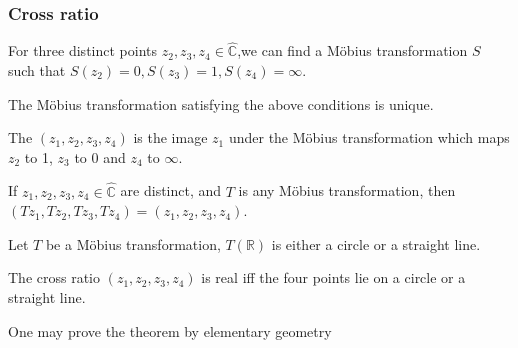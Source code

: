 \subsubsection{Cross ratio}
For three distinct points  $ z_2,z_3,z_4\in\hat{\mathbb{C}} $,we can find a M{\"o}bius transformation  $ S $ such that  $ S(z_2)=0,S(z_3)=1,S(z_4)=\infty $.
\begin{lemma}
    The M{\"o}bius transformation satisfying the above conditions is unique.
\end{lemma}
The  $ (z_1,z_2,z_3,z_4) $ is the image  $ z_1 $ under the M{\"o}bius transformation which maps  $ z_2  $ to 1, $ z_3  $ to 0 and $ z_4  $ to  $ \infty $.
\begin{theorem}
    If  $ z_1,z_2,z_3,z_4\in \hat{\mathbb{C}} $  are distinct, and  $ T  $ is any M{\"o}bius transformation, then $ (Tz_1,Tz_2,Tz_3,Tz_4)=(z_1,z_2,z_3,z_4) $. 
\end{theorem} 
\begin{lemma}
    Let  $ T  $ be a M{\"o}bius transformation,  $ T(\mathbb{R}) $ is either a circle or a straight line.
\end{lemma}  
\begin{theorem}
    The cross ratio  $ (z_1,z_2,z_3,z_4) $ is real iff the four points lie on a circle or a straight line.
\end{theorem}
\begin{remark}
    One may prove the theorem by elementary geometry
\end{remark}
